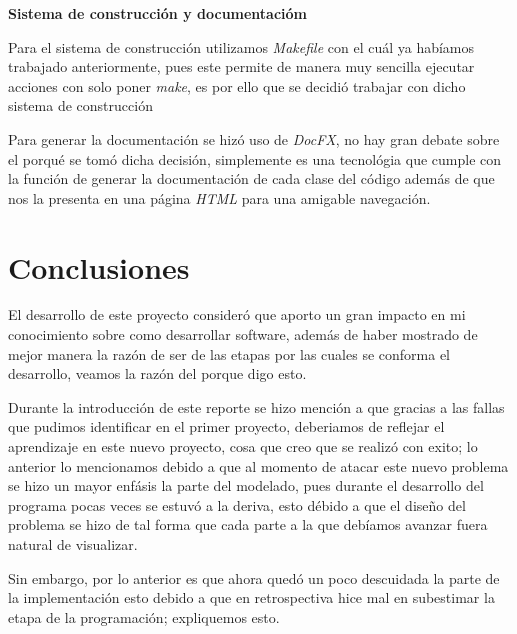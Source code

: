 \documentclass[10pt,letterpaper]{report}
\begin{document}
\vspace{0.5cm}

\noindent \textbf{Sistema de construcción y documentacióm}

\noindent Para el sistema de construcción utilizamos \textit{Makefile} con el cuál ya habíamos trabajado anteriormente, pues este permite de manera muy sencilla ejecutar acciones con solo poner \textit{make}, es por ello que se decidió trabajar con dicho sistema de construcción

\vspace{0.2cm}

\noindent Para generar la documentación se hizó uso de \textit{DocFX}, no hay gran debate sobre el porqué se tomó dicha decisión, simplemente es una tecnológia que cumple con la función de generar la documentación de cada clase del código además de que nos la presenta en una página \textit{HTML} para una amigable navegación.



    \vspace{0.8cm}
    
    \chapter{Conclusiones}
    
    \noindent El desarrollo de este proyecto consideró que aporto un gran impacto en mi conocimiento sobre como desarrollar software, además de haber mostrado de mejor manera la razón de ser de las etapas por las cuales se conforma el desarrollo, veamos la razón del porque digo esto.


    \vspace{0.2cm}

    \noindent Durante la introducción de este reporte se hizo mención a que gracias a las fallas que pudimos identificar en el primer proyecto, deberiamos de reflejar el aprendizaje en este nuevo proyecto, cosa que creo que se realizó con exito; lo anterior lo mencionamos debido a que al momento de atacar este nuevo problema se hizo un mayor enfásis la parte del modelado, pues durante el desarrollo del programa pocas veces se estuvó a la deriva, esto débido a que el diseño del problema se hizo de tal forma que cada parte a la que debíamos avanzar fuera natural de visualizar.

    \vspace{0.2cm}

    \noindent Sin embargo, por lo anterior es que ahora quedó un poco descuidada la parte de la implementación esto debido a que en retrospectiva hice mal en subestimar la etapa de la programación; expliquemos esto.
\end{document}
